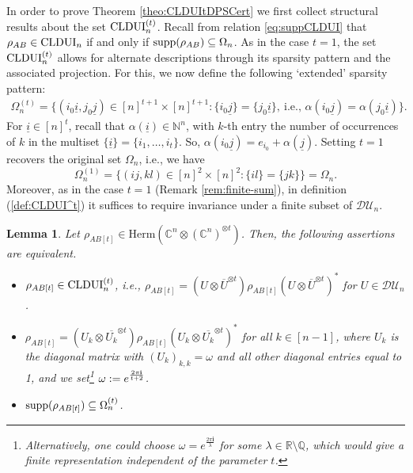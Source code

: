 \documentclass[11pt]{article}
\newcommand{\N}{\ensuremath{\mathbb{N}}}   %
\newcommand{\Q}{\ensuremath{\mathbb{Q}}}   %
\newcommand{\R}{\ensuremath{\mathbb{R}}}   %
\newcommand{\C}{\ensuremath{\mathbb{C}}} %
\newcommand{\MDU}{{\mathcal {DU}}}
\newcommand{\Herm}{\mathrm{Herm}}
\newcommand{\CLDUI}{\text{\rm CLDUI}}
\newcommand{\ot}{\otimes}
\newcommand{\supp}{\text{\rm supp}}
\newcommand{\ui}{\underline{i}}
\newcommand{\uj}{\underline{j}}
\newcommand{\ovU}{\overline U}
\newcommand{\bfi}{\mathbf i}
\theoremstyle{plain}
\newtheorem{lemma}[satz]{Lemma}
\begin{document}
 In order to prove Theorem \ref{theo:CLDUItDPSCert} 
  we  first collect structural results about the set $\CLDUI^{(t)}_n$.
Recall from relation \eqref{eq:suppCLDUI} that $\rho_{AB}\in\CLDUI_n$ if and only if $\supp(\rho_{AB})\subseteq\Omega_n$.  As in the case $t=1$, the set $\CLDUI^{(t)}_n$ allows for alternate descriptions through its sparsity pattern and the associated projection. For this, we now define the following   `extended' sparsity pattern:
\begin{align}\label{def:Omegat}
    \Omega_n^{(t)}=\{(i_0\ui,j_0\uj)\in[n]^{t+1}\times[n]^{t+1}:\{i_0\uj\}=\{j_0\ui\}, \ \text{i.e., } \alpha(i_0\uj)=\alpha(j_0\ui)\}.
\end{align}
For $\ui\in [n]^t$, recall that $\alpha(\ui)\in\N^n$, with $k$-th entry the number of occurrences of $k$ in the multiset $\{\ui\}=\{i_1,\ldots,i_t\}$. So, $\alpha(i_0\uj)=e_{i_0}+\alpha(\uj)$. Setting $t=1$ recovers the original set $\Omega_n$, i.e.,  we have
$$\Omega^{(1)}_n=\{(ij,kl)\in[n]^2\times[n]^2:\{il\}=\{jk\}\}=\Omega_n.$$
Moreover, as in the case $t=1$ (Remark \ref{rem:finite-sum}), in definition (\ref{def:CLDUI^t}) it suffices to require invariance under a finite subset of $\MDU_n$.

\begin{lemma}\label{lem:suppCLDUIt}
    Let $\rho_{AB[t]}\in\Herm(\C^n\ot(\C^n)^{\ot t})$. Then, the following assertions are equivalent.
    \begin{itemize}
    \item[(i)] $\rho_{AB[t]}\in\CLDUI^{(t)}_n$, i.e., $\rho_{AB[t]}= (U\ot \ovU^{\ot t}) \rho_{AB[t]} (U\ot \ovU^{\ot t})^*$ for   $U\in\MDU_n$.
        \item[(ii)]  $\rho_{AB[t]}= (U_k\ot \overline{U_k}^{\ot t}) \rho_{AB[t]} (U_k\ot \overline{U_k}^{\ot t})^*$ for all $k\in [n-1]$, where  
        $U_k$ is the diagonal matrix with $(U_k)_{k,k}=\omega$ and all other diagonal entries equal to 1, and we set\footnote{Alternatively, one could choose  $\omega=e^\frac{2\pi \bfi}{\lambda}$ for some  $\lambda \in\R\setminus\Q$, which would  give a finite representation independent of the parameter $t$.}
         $\omega:=e^{2\pi\bfi\over t+2}$.
                    \item[(iii)] $\supp(\rho_{AB[t]})\subseteq\Omega_n^{(t)}$.
    \end{itemize}
\end{lemma}
\end{document}
